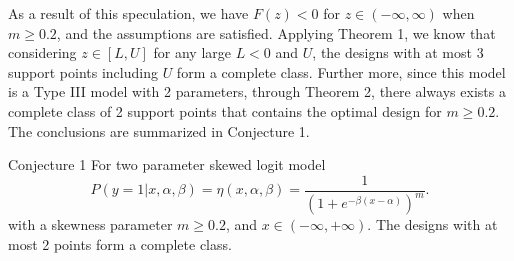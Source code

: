 \documentclass[12pt]{TD-CJS}
\begin{document}
As a result of this speculation, we have $F(z)<0$ for $z\in (-\infty,\infty)$ when $m\ge 0.2$, and the assumptions are satisfied. Applying Theorem 1, we know that considering $z\in[L,U]$ for any large $L<0$ and $U$, the designs with at most 3 support points including $U$ form a complete class. Further more, since this model is a Type III model with 2 parameters, through Theorem 2, there always exists a complete class of 2 support points that contains the optimal design for $m\ge0.2$. The conclusions are summarized in Conjecture 1.

     

\begin{theorem}{Conjecture 1}{}\label{skew}
For two parameter skewed logit model\[
P(y=1|x,\alpha,\beta) = \eta(x,\alpha,\beta)= \frac{1}{(1+e^{-\beta(x-\alpha)})^m}.
\]with a skewness parameter $m\ge0.2$, and $x\in (-\infty,+\infty)$. The designs with at most 2 points form a complete class.
\end{theorem}
\end{document}
